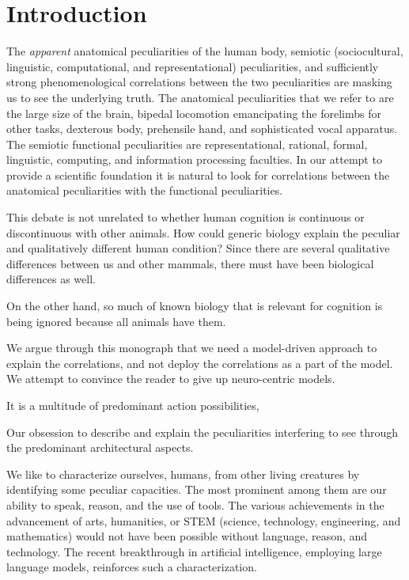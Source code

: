
\section{Introduction}

The \textit{apparent} anatomical peculiarities of the human body, semiotic (sociocultural, linguistic, computational, and representational) peculiarities, and sufficiently strong phenomenological correlations between the two peculiarities are
masking us to see the underlying truth.  The anatomical peculiarities that we refer to are the large size of the brain, bipedal locomotion emancipating the forelimbs for other tasks, dexterous body, prehensile hand, and sophisticated vocal apparatus. The semiotic functional peculiarities are representational, rational, formal, linguistic, computing, and information processing faculties.  In our attempt to provide a scientific foundation it is natural to look for correlations between the anatomical peculiarities with the functional peculiarities.  

This debate is not unrelated to whether human cognition is continuous or discontinuous with other animals.   How could generic biology explain the peculiar and qualitatively different human condition?  Since there are several qualitative differences between us and other mammals, there must have been biological differences as well.    



On the other hand, so much of known biology that is relevant for cognition is being ignored because all animals have them.  

We argue through this monograph that we need a model-driven approach to explain the correlations, and not deploy the correlations as a part of the model.  
We attempt to convince the reader to give up neuro-centric models. 





It is a multitude of predominant action possibilities,  

Our obsession to describe and explain the peculiarities interfering to see through the predominant architectural aspects. 



We like to characterize ourselves, humans, from other living creatures by identifying some peculiar capacities.  The most prominent among them are our ability to speak, reason, and the use of tools.  The various achievements in the advancement of arts, humanities, or STEM (science, technology, engineering, and mathematics) would not have been possible without language, reason, and technology.  The recent breakthrough in artificial intelligence, employing large language models, reinforces such a characterization. 

